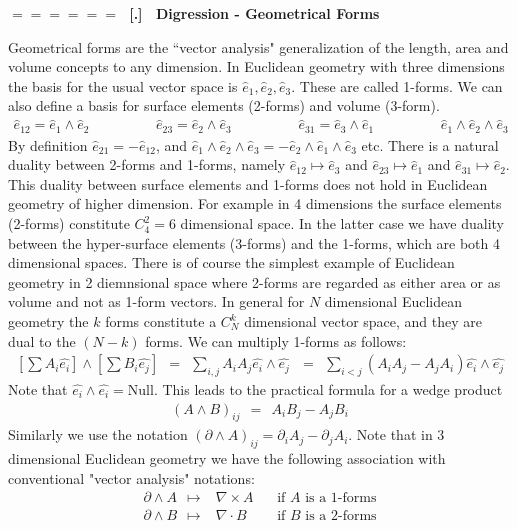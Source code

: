 \documentclass[onecolumn,fleqn]{revtex4}
\newcommand{\beq}{\begin{eqnarray}}
\newcommand{\eeq}{\end{eqnarray}}
\renewcommand{\thesubsection}{\arabic{subsection}}
\renewcommand{\thesubsubsection}{\arabic{subsubsection}}
\newcommand{\sheadC}[1]
{
\addtocounter{subsubsection}{1}
\vspace{5mm}
{\Large\bf $=\!=\!=\!=\!=\!=\;$ [\thesubsection.\thesubsubsection] \ #1}  
\nopagebreak
\phantomsection
}
\begin{document}
\sheadC{Digression - Geometrical Forms}

    
Geometrical forms are the ``vector analysis"  
generalization of the length, area and volume concepts 
to any dimension. 
In Euclidean geometry with three dimensions 
the basis for the usual vector space 
is $\hat{e}_1,\hat{e}_2,\hat{e}_3$. 
These are called 1-forms. We can also define 
a basis for surface elements (2-forms) and volume (3-form).
\beq
\hat{e}_{12} = \hat{e}_1\wedge\hat{e}_2 
\hspace{2cm}
\hat{e}_{23} = \hat{e}_2\wedge\hat{e}_3 
\hspace{2cm}
\hat{e}_{31} = \hat{e}_3\wedge\hat{e}_1
\hspace{2cm}
\hat{e}_1\wedge\hat{e}_2\wedge\hat{e}_3
\eeq
By definition $\hat{e}_{21} = -\hat{e}_{12}$, and $\hat{e}_1\wedge\hat{e}_2\wedge\hat{e}_3=-\hat{e}_2\wedge\hat{e}_1\wedge\hat{e}_3$ etc. 
There is a natural duality between 2-forms and 1-forms, 
namely $\hat{e}_{12} \mapsto \hat{e}_3$ 
and  $\hat{e}_{23} \mapsto \hat{e}_1$ 
and $\hat{e}_{31} \mapsto \hat{e}_2$. 
This duality between surface elements and 1-forms does not hold in Euclidean geometry of higher dimension. 
For example in 4 dimensions the surface elements (2-forms) constitute $C^2_4=6$ dimensional space. 
In the latter case we have duality between the hyper-surface elements (3-forms) and the 1-forms, which are both 4 dimensional spaces.   
There is of course the simplest example of Euclidean geometry in 2 diemnsional space 
where 2-forms are regarded as either area or as volume and not as 1-form vectors.  
In general for $N$ dimensional Euclidean geometry the $k$ forms constitute a $C^k_N$ 
dimensional vector space, and they are dual to the $(N-k)$ forms. 
We can multiply 1-forms as follows:
\beq
\left[\sum A_i \hat{e_i} \right] \wedge \left[ \sum B_i\hat{e_j} \right]
\ \ = \ \ \sum_{i,j} A_i A_j \hat{e_i}\wedge\hat{e_j}\
\ \ = \ \ \sum_{i<j} (A_i A_j-A_j A_i)\hat{e_i}\wedge\hat{e_j}
\eeq
Note that $\hat{e_i}\wedge\hat{e_i}=\mbox{Null}$. 
This leads to the practical formula for a wedge product  
\beq
(A\wedge B)_{ij} \ \ = \ \ A_i B_j-A_j B_i
\eeq
Similarly we use the notation $(\partial \wedge A)_{ij}=\partial_i A_j - \partial_j A_i$. 
Note that in 3 dimensional Euclidean geometry we have the following association 
with conventional "vector analysis" notations:  
\beq
\partial \wedge A \ \ \mapsto & \nabla \times A  \ \ \ \ & \mbox{if $A$ is a 1-forms}
\\ \nonumber
\partial \wedge B \ \ \mapsto & \nabla \cdot B \ \ \ \ \ & \mbox{if $B$ is a 2-forms}
\eeq
\end{document}

